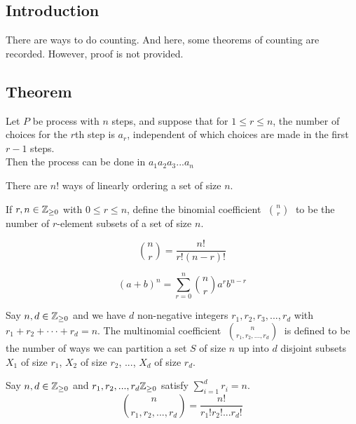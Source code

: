 \documentclass[a4paper]{article}
\begin{document}
\subsection{Introduction}
There are ways to do counting. And here, some theorems of counting are recorded. However, proof is not provided.

\subsection{Theorem}
\begin{nthm}
Let $P$ be process with $n$ steps, and suppose that for $1 \leq r \leq n$, the number of choices for the $r$th step is $a_r$, independent of which choices are made in the first $r - 1$ steps.\\
Then the process can be done in $a_1a_2a_3 ... a_n$
\end{nthm}

\begin{nthm}
There are $n!$ ways of linearly ordering a set of size $n$.
\end{nthm}

\begin{ndefi}
 If $r,n \in \mathbb{Z}_{\geq 0}$ with $0 \leq r \leq n$, define the binomial coefficient 􏰀$\binom{n}{r}$􏰁 to be the number of $r$-element subsets of a set of size $n$.
\end{ndefi}

\begin{nthm}[$\binom{n}{r}$􏰁]
$$\binom{n}{r} = \frac{n!}{r!(n-r)!}$$
\end{nthm}

\begin{nthm}
$$(a + b)^n = \sum^n_{r=0}\binom{n}{r}a^rb^{n-r}$$
\end{nthm}

\begin{ndefi}
Say $n, d \in \mathbb{Z}_{\geq 0}$ and we have $d$ non-negative integers $r_1, r_2, r_3, ... , r_d$ with $r_1 +r_2 +···+r_d = n$. The multinomial coefficient􏰀 $\binom{n}{r_1, r_2, ..., r_d}$ 􏰁is defined to be the number of ways we can partition a set $S$ of size $n$ up into $d$ disjoint subsets $X_1$ of size $r_1$, $X_2$ of size $r_2$, ..., $X_d$ of size $r_d$.
\end{ndefi}

\begin{nthm}[$\binom{n}{r_1, r_2, ..., r_d}$]
Say $n, d \in \mathbb{Z}_{\geq 0}$ and $r_1,r_2, ... ,r_d \mathbb{Z}_{\geq 0}$ satisfy $\sum^d_{i=1} r_i = n$.
􏰌$$\binom{n}{r_1, r_2, ..., r_d} = \frac{n!}{r_1! r_2! ... r_d!}$$
\end{nthm}
\end{document}
